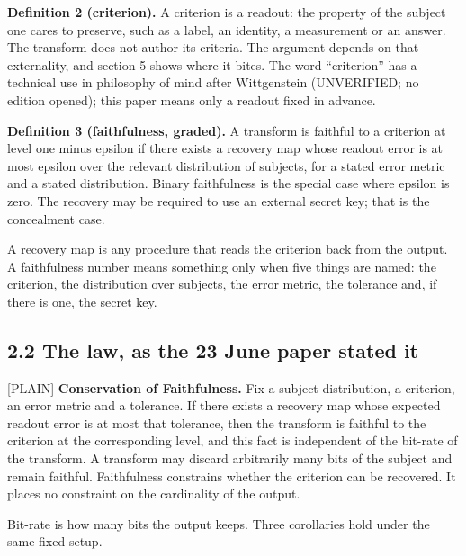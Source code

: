 \documentclass[11pt]{article}
\newcommand{\register}[1]{{\ttfamily\small #1}}
\begin{document}
\textbf{Definition 2 (criterion).} A criterion is a readout: the property of the subject one cares to preserve, such as a label, an identity, a measurement or an answer. The transform does not author its criteria. The argument depends on that externality, and section 5 shows where it bites. The word ``criterion'' has a technical use in philosophy of mind after Wittgenstein (UNVERIFIED; no edition opened); this paper means only a readout fixed in advance.

\textbf{Definition 3 (faithfulness, graded).} A transform is faithful to a criterion at level one minus epsilon if there exists a recovery map whose readout error is at most epsilon over the relevant distribution of subjects, for a stated error metric and a stated distribution. Binary faithfulness is the special case where epsilon is zero. The recovery may be required to use an external secret key; that is the concealment case.

A recovery map is any procedure that reads the criterion back from the output. A faithfulness number means something only when five things are named: the criterion, the distribution over subjects, the error metric, the tolerance and, if there is one, the secret key.

\subsection*{2.2 The law, as the 23 June paper stated it}

\register{[PLAIN]} \textbf{Conservation of Faithfulness.} Fix a subject distribution, a criterion, an error metric and a tolerance. If there exists a recovery map whose expected readout error is at most that tolerance, then the transform is faithful to the criterion at the corresponding level, and this fact is independent of the bit-rate of the transform. A transform may discard arbitrarily many bits of the subject and remain faithful. Faithfulness constrains whether the criterion can be recovered. It places no constraint on the cardinality of the output.

Bit-rate is how many bits the output keeps. Three corollaries hold under the same fixed setup.
\end{document}
